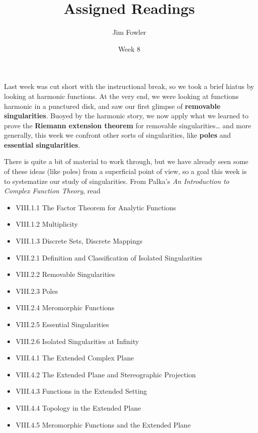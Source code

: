 \documentclass{homework}
\author{Jim Fowler}
\title{Assigned Readings}
\date{Week 8}
\begin{document}
\maketitle

Last week was cut short with the instructional break, so we took a
brief hiatus by looking at harmonic functions.  At the very end, we
were looking at functions harmonic in a punctured disk, and saw our
first glimpse of \textbf{removable singularities}.  Buoyed by the
harmonic story, we now apply what we learned to prove the
\textbf{Riemann extension theorem} for removable singularities\ldots
and more generally, this week we confront other sorts of
singularities, like \textbf{poles} and \textbf{essential
  singularities}.

There is quite a bit of material to work through, but we have already
seen some of these ideas (like poles) from a superficial point of
view, so a goal this week is to systematize our study of
singularities.  From Palka's \textit{An Introduction to Complex
  Function Theory}, read
\begin{itemize}
\item VIII.1.1 The Factor Theorem for Analytic Functions
\item VIII.1.2 Multiplicity
\item VIII.1.3 Discrete Sets, Discrete Mappings
\item VIII.2.1 Definition and Classification of Isolated Singularities
\item VIII.2.2 Removable Singularities
\item VIII.2.3 Poles
\item VIII.2.4 Meromorphic Functions
\item VIII.2.5 Essential Singularities
\item VIII.2.6 Isolated Singularities at Infinity
\item VIII.4.1 The Extended Complex Plane
\item VIII.4.2 The Extended Plane and Stereographic Projection
\item VIII.4.3 Functions in the Extended Setting
\item VIII.4.4 Topology in the Extended Plane
\item VIII.4.5 Meromorphic Functions and the Extended Plane
\end{itemize}
\end{document}

